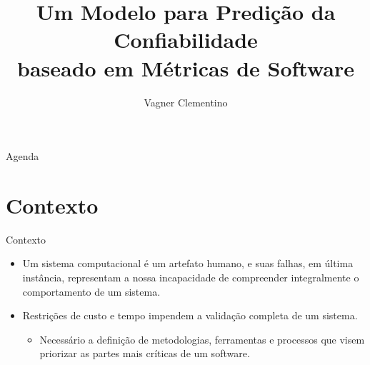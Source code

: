 \documentclass[t,14pt,mathserif]{beamer}
\title[] %
{Um Modelo para Predição da Confiabilidade\\
baseado em Métricas de Software}
\subtitle{Vagner Clementino}
\institute[] %
{
  Departamento de Ciência da Computação\\
  Universidade Federal de Minas Gerais(UFMG)\\
  Software Quality and Measurement - 2015-1\\
  }
\date[2015/06/21] %
\begin{document}
\begin{frame}
  \titlepage
\end{frame}

\begin{frame}{Agenda}
  \tableofcontents
\end{frame}






\section{Contexto}

\begin{frame}{Contexto}
	\begin{itemize}
	

		\item Um sistema computacional é um artefato humano, e suas falhas, em última instância, representam a nossa incapacidade de compreender integralmente o comportamento de um sistema\cite{Lyu:1996}.
	
		\item Restrições de custo e tempo impendem a validação completa de um sistema.
		
		\begin{itemize}
		
			\item Necessário a definição de metodologias, ferramentas e processos que visem priorizar as partes mais críticas de um software.
		\end{itemize}
	\end{itemize}
\end{frame}
\end{document}
